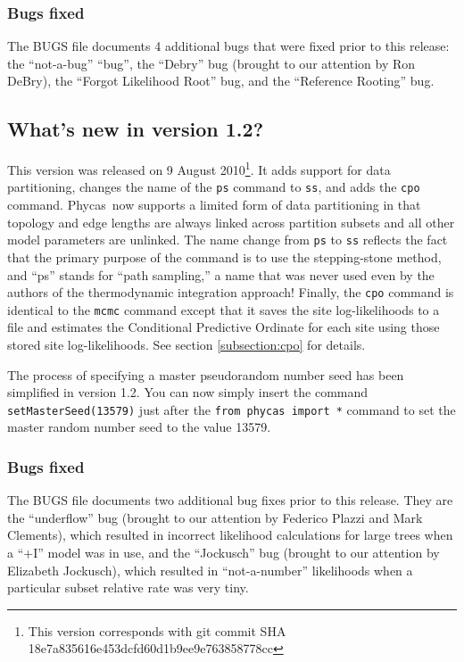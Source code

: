 \documentclass[10pt]{article}
\newcommand{\code}[1]{{\tt #1}}					%
\newcommand{\cmd}[1]{{\tt \small #1}\index{#1}}	%
\newcommand{\phycas}{{\sc Phycas}\index{Phycas}}
\begin{document}
\subsubsection{Bugs fixed}
The BUGS file documents 4 additional bugs that were fixed prior to this release: the ``not-a-bug'' ``bug'', the ``Debry'' bug (brought to our attention by Ron DeBry), the ``Forgot Likelihood Root'' bug, and the ``Reference Rooting'' bug.

\subsection{What's new in version 1.2?} %
This version was released on 9 August 2010\footnote{This version corresponds with git commit SHA 18e7a835616e453dcfd60d1b9ee9e763858778cc}. It adds support for data partitioning, changes the name of the \cmd{ps} command to \cmd{ss}, and adds the \cmd{cpo} command. \phycas\ now supports a limited form of data partitioning in that topology and edge lengths are always linked across partition subsets and all other model parameters are unlinked. The name change from \cmd{ps} to \cmd{ss} reflects the fact that the primary purpose of the command is to use the stepping-stone method, and ``ps'' stands for ``path sampling,'' a name that was never used even by the authors of the thermodynamic integration approach! Finally, the \cmd{cpo} command is identical to the \cmd{mcmc} command except that it saves the site log-likelihoods to a file and estimates the Conditional Predictive Ordinate for each site using those stored site log-likelihoods. See section \ref{subsection:cpo} for details. 

The process of specifying a master pseudorandom number seed has been simplified in version 1.2. You can now simply insert the command \code{setMasterSeed(13579)} just after the \code{from phycas import *} command to set the master random number seed to the value 13579.

\subsubsection{Bugs fixed}
The BUGS file documents two additional bug fixes prior to this release. They are the ``underflow'' bug (brought to our attention by Federico Plazzi and Mark Clements), which resulted in incorrect likelihood calculations for large trees when a ``+I'' model was in use, and the ``Jockusch'' bug (brought to our attention by Elizabeth Jockusch), which resulted in ``not-a-number'' likelihoods when a particular subset relative rate was very tiny.
\end{document}
